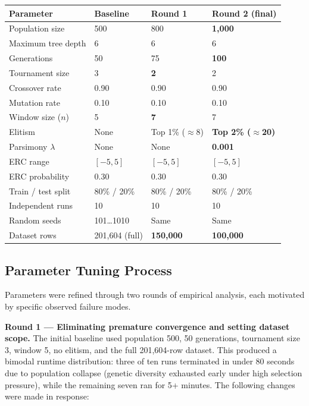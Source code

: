 \documentclass[12pt,a4paper]{article}
\begin{document}
\begin{center}
\begin{tabular}{L{5cm} L{2.8cm} L{2.8cm} L{3cm}}
\toprule
\textbf{Parameter} & \textbf{Baseline} & \textbf{Round 1} & \textbf{Round 2 (final)} \\
\midrule
Population size          & 500           & 800           & \textbf{1,000} \\
Maximum tree depth       & 6             & 6             & 6 \\
Generations              & 50            & 75            & \textbf{100} \\
Tournament size          & 3             & \textbf{2}    & 2 \\
Crossover rate           & 0.90          & 0.90          & 0.90 \\
Mutation rate            & 0.10          & 0.10          & 0.10 \\
Window size ($n$)        & 5             & \textbf{7}    & 7 \\
Elitism                  & None          & Top 1\% ($\approx$8) & \textbf{Top 2\% ($\approx$20)} \\
Parsimony $\lambda$      & None          & None          & \textbf{0.001} \\
ERC range                & $[-5, 5]$     & $[-5, 5]$     & $[-5, 5]$ \\
ERC probability          & 0.30          & 0.30          & 0.30 \\
Train / test split       & 80\% / 20\%   & 80\% / 20\%   & 80\% / 20\% \\
Independent runs         & 10            & 10            & 10 \\
Random seeds             & 101\ldots1010 & Same          & Same \\
Dataset rows             & 201,604 (full) & \textbf{150,000} & \textbf{100,000} \\
\bottomrule
\end{tabular}
\end{center}

\subsection{Parameter Tuning Process}

Parameters were refined through two rounds of empirical analysis, each motivated by specific observed failure modes.

\textbf{Round 1 --- Eliminating premature convergence and setting dataset scope.}
The initial baseline used population 500, 50 generations, tournament size 3, window 5, no elitism, and the full 201,604-row dataset. This produced a bimodal runtime distribution: three of ten runs terminated in under 80 seconds due to population collapse (genetic diversity exhausted early under high selection pressure), while the remaining seven ran for 5+ minutes. The following changes were made in response:
\end{document}

